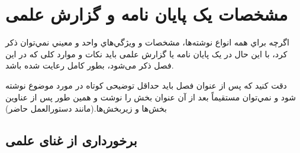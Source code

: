 \chapter{مشخصات یک پایان نامه و گزارش علمی}

اگرچه براي همه انواع نوشته‌ها، مشخصات و ويژگي‌هاي واحد و معيني نمي‌توان ذكر كرد، با اين حال در یک پایان نامه یا گزارش علمی باید نکات و موارد کلی که در این فصل ذکر می‌شود، بطور کامل رعایت شده باشد. 

دقت كنيد كه پس از عنوان فصل بايد حداقل توضیحی کوتاه در مورد موضوع نوشته شود و نمي‌توان مستقيماً بعد از آن عنوان بخش را نوشت و همين طور پس از عناوين بخش‌ها و زيربخش‌ها.(مانند دستورالعمل حاضر)
\section{برخورداری از غنای علمی }
